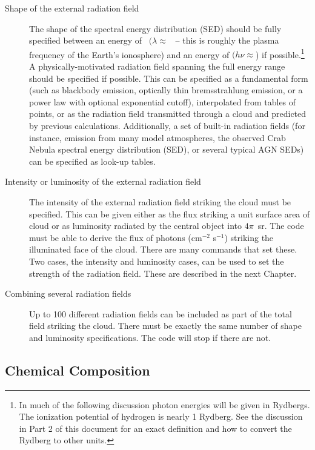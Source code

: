 \begin{description}

\item[Shape of the external radiation field]
The shape of the spectral energy distribution (SED)
should be fully specified between an energy
of \emm\ $(\lambda \approx$ \emmcm \ -- this is roughly 
the plasma frequency of the Earth's ionosphere) and an energy
of \egamry $(h\nu \approx$\egamrymev)
if possible.\footnote{
In much of the following discussion photon energies will
be given in Rydbergs.  The ionization potential of hydrogen is nearly 1
Rydberg.  See the discussion in Part 2 of this document for an exact
definition and how to convert the Rydberg to other units.}
A physically-motivated radiation field spanning the full energy range
should be specified if possible.
This can be specified as a fundamental
form (such as blackbody emission, optically thin bremsstrahlung emission,
or a power law with optional exponential cutoff), interpolated from tables
of points, or as the radiation field transmitted through a cloud and
predicted by previous calculations.
Additionally, a set of built-in radiation fields
(for instance, emission from many model atmospheres, the observed
Crab Nebula spectral energy distribution (SED), or several typical AGN SEDs) can be specified as look-up tables.

\item[Intensity or luminosity of the external radiation field]
The intensity of the external radiation field striking the
cloud must be specified.
This can be given either as the flux striking a unit surface
area of cloud or as luminosity  radiated by the central object into $4\pi$~sr.
The code must be able to derive the flux of photons (cm$^{-2}$ s$^{-1}$) striking
the illuminated face of the cloud.
There are many commands that set these.
Two cases, the intensity and luminosity cases, can be used to
set the strength of the radiation field.
These are described in the next Chapter.

\item[Combining several radiation fields]
Up to 100 different radiation fields can be included as part of
the total field striking the cloud.
There must be exactly the same number of shape and luminosity
specifications.
The code will stop if there are not.

\end{description}

\subsection{Chemical Composition}

